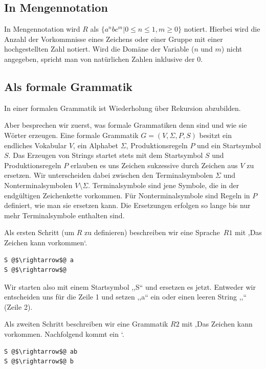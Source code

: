 \subsection{In Mengennotation}
%
In Mengennotation wird $R$ als $\{a^n b c^m | 0\leq n\leq 1, m \geq 0\}$ notiert. Hierbei wird die Anzahl der Vorkommnisse eines Zeichens oder einer Gruppe mit einer hochgestellten Zahl notiert. Wird die Domäne der Variable ($n$ und $m$) nicht angegeben, spricht man von natürlichen Zahlen inklusive der 0.

\subsection{Als formale Grammatik}
%
In einer formalen Grammatik ist Wiederholung über Rekursion abzubilden.

Aber besprechen wir zuerst, was formale Grammatiken denn sind und wie sie Wörter erzeugen. Eine formale Grammatik $G = (V, \Sigma, P, S)$ besitzt ein endliches Vokabular $V$, ein Alphabet $\Sigma$, Produktionsregeln $P$ und ein Startsymbol $S$. Das Erzeugen von Strings startet stets mit dem Startsymbol $S$ und Produktionsregeln $P$ erlauben es uns Zeichen sukzessive durch Zeichen aus $V$ zu ersetzen. Wir unterscheiden dabei zwischen den Terminalsymbolen $\Sigma$ und Nonterminalsymbolen $V \setminus \Sigma$. Terminalsymbole sind jene Symbole, die in der endgültigen Zeichenkette vorkommen. Für Nonterminalsymbole sind Regeln in $P$ definiert, wie man sie ersetzen kann. Die Ersetzungen erfolgen so lange bis nur mehr Terminalsymbole enthalten sind.

Als ersten Schritt (um $R$ zu definieren) beschreiben wir eine Sprache~$R1$ mit ,Das Zeichen  kann vorkommen`.
\begin{lstlisting}
S @$\rightarrow$@ a
S @$\rightarrow$@
\end{lstlisting}

Wir starten also mit einem Startsymbol ,,S`` und ersetzen es jetzt. Entweder wir entscheiden uns für die Zeile 1 und setzen ,,a`` ein oder einen leeren String ,,`` (Zeile 2).

Als zweiten Schritt beschreiben wir eine Grammatik $R2$ mit ,Das Zeichen  kann vorkommen. Nachfolgend kommt ein `.
\begin{lstlisting}
S @$\rightarrow$@ ab
S @$\rightarrow$@ b
\end{lstlisting}

